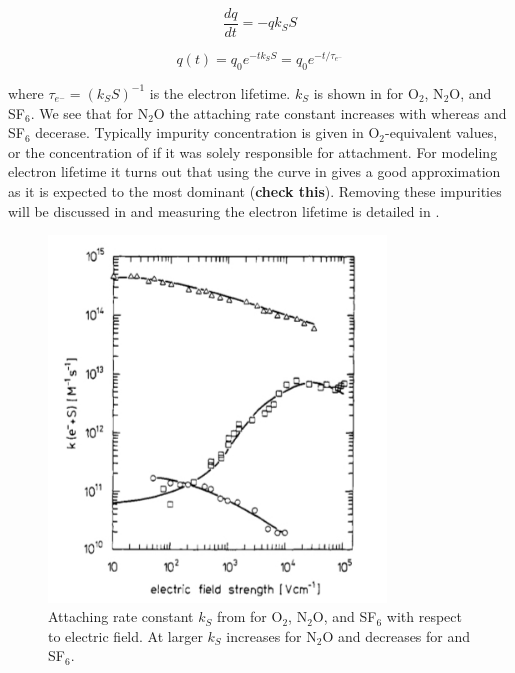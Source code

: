 \begin{equation}
\frac{dq}{dt} = -qk_{S}S
\label{eq:lifetime_diff_eq}
\end{equation}

\begin{equation}
q(t) = q_{0}e^{-tk_{S}S} = q_{0}e^{-t/\tau_{e^-}}
\label{eq:lifetime_equation}
\end{equation}

\noindent where $\tau_{e^-} = (k_{S}S)^{-1}$ is the electron lifetime.  $k_{S}$ is shown in  for
O$_{2}$,
N$_{2}$O, and SF$_{6}$.  We see that for N$_{2}$O the attaching rate constant increases with \efield whereas \otwo and SF$_{6}$
decerase.  Typically impurity concentration is given in O$_{2}$-equivalent values, or the concentration of \otwo if it was solely
responsible for \electron attachment.  For modeling electron lifetime it turns out that using the \otwo curve in
 gives a good approximation as it is expected to the most dominant (\textbf{check this}).  Removing these
impurities will be discussed in  and measuring the electron lifetime is detailed in
.

\begin{figure}
\includegraphics[width=0.8\textwidth]{AttachmentRate}
\caption{Attaching rate constant $k_{S}$ from  for O$_{2}$, N$_{2}$O, and SF$_{6}$ with respect to electric field.  At
larger \efields $k_{S}$ increases for N$_{2}$O and decreases for \otwo and SF$_{6}$.}
\label{fig:attachment_rate}
\end{figure}

